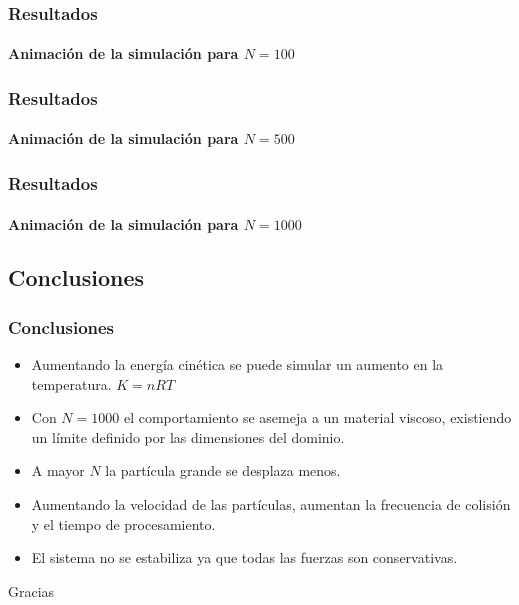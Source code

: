 \documentclass[hyperref={pdfpagelayout=SinglePage}]{beamer}
\begin{document}
\begin{frame}
\frametitle{Resultados}
\framesubtitle{Animación de la simulación para $N = 100$}
\begin{figure}[H]
	\centering
\end{figure}
\end{frame}

\begin{frame}
\frametitle{Resultados}
\framesubtitle{Animación de la simulación para $N = 500$}
\begin{figure}[H]
	\centering
\end{figure}
\end{frame}

\begin{frame}
\frametitle{Resultados}
\framesubtitle{Animación de la simulación para $N = 1000$}
\begin{figure}[H]
	\centering
\end{figure}
\end{frame}

\subsection{Conclusiones}

\begin{frame}
\frametitle{Conclusiones}
\begin{itemize}
	\item Aumentando la energía cinética se puede simular un aumento en la temperatura. $K = n R T$
	\item Con $N = 1000$ el comportamiento se asemeja a un material viscoso, existiendo un límite definido por las dimensiones del dominio.
	\item A mayor $N$ la partícula grande se desplaza menos.
	\item Aumentando la velocidad de las partículas, aumentan la frecuencia de colisión y el tiempo de procesamiento.
	\item El sistema no se estabiliza ya que todas las fuerzas son conservativas.
\end{itemize}
\end{frame}

\begin{frame}[plain,c]
\begin{center}
	\Huge Gracias
\end{center}
\end{frame}
\end{document}
